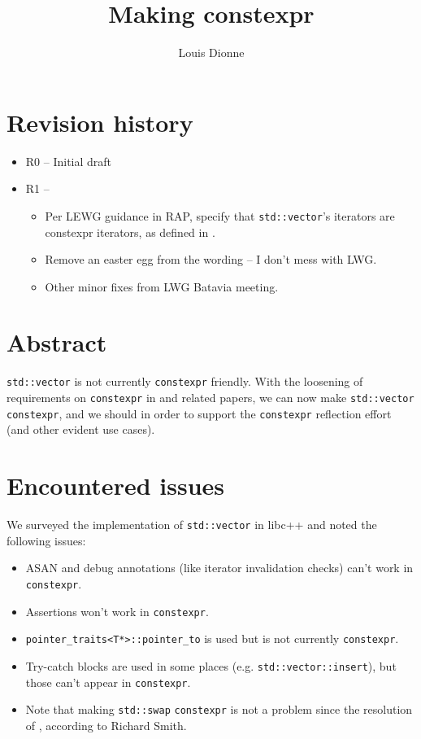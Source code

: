 \documentclass{wg21}
\title{Making \cc{std::vector} constexpr}
\author{Louis Dionne}{ldionne.2@gmail.com}
\newcommand{\cc}[1]{\texttt{#1}}
\begin{document}
\maketitle

\section{Revision history}
\begin{itemize}
  \item R0 -- Initial draft
  \item R1 -- \begin{itemize}
              \item Per LEWG guidance in RAP, specify that \cc{std::vector}'s
                    iterators are constexpr iterators, as defined in \cite{P0858R0}.
              \item Remove an easter egg from the wording -- I don't mess
                    with LWG.
              \item Other minor fixes from LWG Batavia meeting.
              \end{itemize}
\end{itemize}


\section{Abstract}
\cc{std::vector} is not currently \cc{constexpr} friendly. With the loosening
of requirements on \cc{constexpr} in \cite{P0784R1} and related papers, we
can now make \cc{std::vector} \cc{constexpr}, and we should in order to support
the \cc{constexpr} reflection effort (and other evident use cases).


\section{Encountered issues}
We surveyed the implementation of \cc{std::vector} in libc++ and noted the
following issues:
\begin{itemize}
  \item ASAN and debug annotations (like iterator invalidation checks) can't
        work in \cc{constexpr}.
  \item Assertions won't work in \cc{constexpr}.
  \item \cc{pointer_traits<T*>::pointer_to} is used but is not currently
        \cc{constexpr}.
  \item Try-catch blocks are used in some places (e.g. \cc{std::vector::insert}),
        but those can't appear in \cc{constexpr}.
  \item Note that making \cc{std::swap} \cc{constexpr} is not a problem since
        the resolution of \cite{P0859R0}, according to Richard Smith.
\end{itemize}
\end{document}
